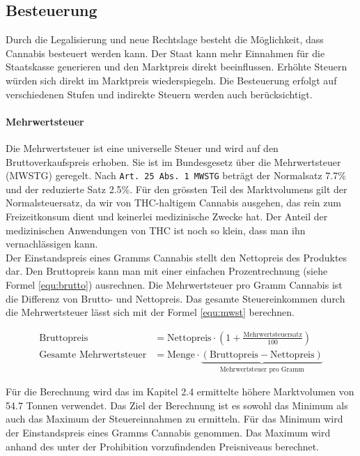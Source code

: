 \documentclass[../main.tex]{subfiles}
\begin{document}
	 
	 \subsection{Besteuerung}
	 Durch die Legalisierung und neue Rechtslage besteht die Möglichkeit, dass Cannabis besteuert werden kann.
	 Der Staat kann mehr Einnahmen für die Staatskasse generieren und den Marktpreis direkt beeinflussen.
	 Erhöhte Steuern würden sich direkt im Marktpreis wiederspiegeln.
	 Die Besteuerung erfolgt auf verschiedenen Stufen und indirekte Steuern werden auch berücksichtigt.
	 
	 \paragraph{Mehrwertsteuer}
	 Die Mehrwertsteuer ist eine universelle Steuer und wird auf den Bruttoverkaufspreis erhoben.
	 Sie ist im Bundesgesetz über die Mehrwertsteuer (MWSTG) geregelt.
	 Nach \texttt{Art. 25 Abs. 1 MWSTG} beträgt der Normalsatz 7.7\% und der reduzierte Satz 2.5\%.
	 Für den grössten Teil des Marktvolumens gilt der Normalsteuersatz, da wir von THC-haltigem Cannabis ausgehen, das rein zum Freizeitkonsum dient und keinerlei medizinische Zwecke hat. 
	 Der Anteil der medizinischen Anwendungen von THC ist noch so klein, dass man ihn vernachlässigen kann.\\
	 
	 \noindent
	 Der Einstandspreis eines Gramms Cannabis stellt den Nettopreis des Produktes dar.
	 Den Bruttopreis kann man mit einer einfachen Prozentrechnung (siehe Formel \ref{equ:brutto}) ausrechnen. 
	 Die Mehrwertsteuer pro Gramm Cannabis ist die Differenz von Brutto- und Nettopreis.
	 Das gesamte Steuereinkommen durch die Mehrwertsteuer lässt sich mit der Formel \ref{equ:mwst} berechnen.
	 
	 \noindent
	 \begin{align}
	 	 \text{Bruttopreis} &= \text{Nettopreis} \cdot \left( 1 + \frac{\text{Mehrwertsteuersatz}}{100} \right)\label{equ:brutto} \\[7pt]
	 	\text{Gesamte Mehrwertsteuer} &= \text{Menge} \cdot \underbrace{\left(\text{Bruttopreis} - \text{Nettopreis} \right)}_{\text{Mehrwertsteuer pro Gramm}} \label{equ:mwst} 
	 \end{align}
	 
	 \noindent
	 Für die Berechnung wird das im Kapitel 2.4 ermittelte höhere Marktvolumen von 54.7 Tonnen verwendet.	 
	 Das Ziel der Berechnung ist es sowohl das Minimum als auch das Maximum der Steuereinnahmen zu ermitteln.
	 Für das Minimum wird der Einstandspreis eines Gramms Cannabis genommen.
	 Das Maximum wird anhand des unter der Prohibition vorzufindenden Preisniveaus berechnet.
\end{document}
